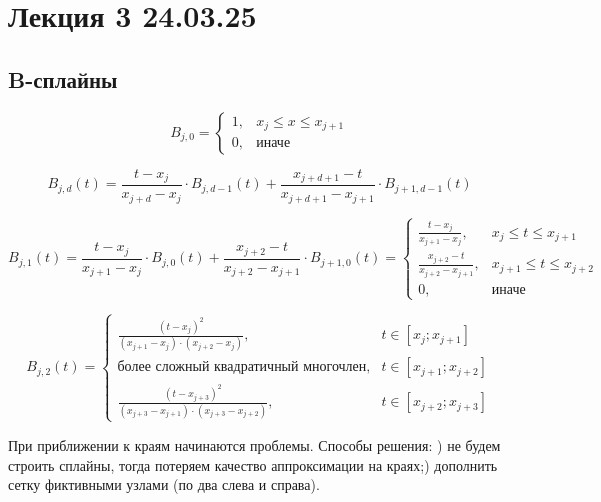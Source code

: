 \section{Лекция 3 24.03.25}

\subsection{B-сплайны}

\begin{equation}
    B_{j,0} = \begin{cases}  
        1, & x_j \leq x \leq x_{j+1} \\
        0, & \text{иначе}
    \end{cases}
\end{equation}

\begin{equation}
    B_{j,d}(t) = \frac{t - x_j}{x_{j+d} - x_j} \cdot B_{j, d-1}(t) + 
    \frac{x_{j+d+1} - t}{x_{j+d+1} - x_{j+1}} \cdot B_{j+1, d-1}(t)
\end{equation}

\begin{equation}
    B_{j,1}(t) = \frac{t - x_j}{x_{j+1} - x_j} \cdot B_{j, 0}(t) +
        \frac{x_{j+2} - t}{x_{j+2} - x_{j+1}} \cdot B_{j+1, 0}(t) = \begin{cases}
        \frac{t - x_j}{x_{j+1} - x_j}, & x_j \leq t \leq x_{j+1}\\
        \frac{x_{j+2} - t}{x_{j+2} - x_{j+1}}, & x_{j+1} \leq t \leq x_{j+2}\\
        0, & \text{иначе}
    \end{cases}
\end{equation}

\begin{equation}
    B_{j,2}(t) = \begin{cases}
        \frac{(t - x_j)^2}{(x_{j+1} - x_j) \cdot (x_{j+2} - x_j)}, & t \in [x_j; x_{j+1}]\\
        \text{более сложный квадратичный многочлен}, & t \in [x_{j+1}; x_{j+2}]\\
        \frac{(t - x_{j+3})^2}{(x_{j+3} - x_{j+1}) \cdot (x_{j+3} - x_{j+2})}, & t \in [x_{j+2}; x_{j+3}]
    \end{cases}
\end{equation}

При приближении к краям начинаются проблемы. Способы решения: ) не будем строить сплайны, тогда потеряем качество аппроксимации на краях;) дополнить сетку фиктивными узлами (по два слева и справа).

